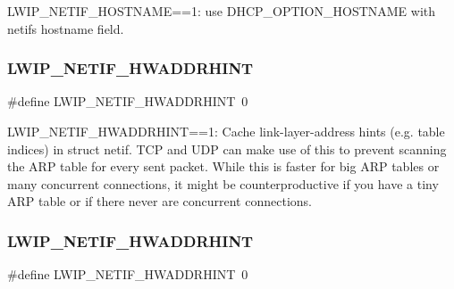 L\+W\+I\+P\+\_\+\+N\+E\+T\+I\+F\+\_\+\+H\+O\+S\+T\+N\+A\+ME==1\+: use D\+H\+C\+P\+\_\+\+O\+P\+T\+I\+O\+N\+\_\+\+H\+O\+S\+T\+N\+A\+ME with netif\textquotesingle{}s hostname field. \mbox{\label{group__lwip__opts__netif_gad1d5e878d94b56ba687cef69be936ad9}} 
\subsubsection{\texorpdfstring{L\+W\+I\+P\+\_\+\+N\+E\+T\+I\+F\+\_\+\+H\+W\+A\+D\+D\+R\+H\+I\+NT}{LWIP\_NETIF\_HWADDRHINT}\hspace{0.1cm}{\footnotesize\ttfamily [1/2]}}
{\footnotesize\ttfamily \#define L\+W\+I\+P\+\_\+\+N\+E\+T\+I\+F\+\_\+\+H\+W\+A\+D\+D\+R\+H\+I\+NT~0}

L\+W\+I\+P\+\_\+\+N\+E\+T\+I\+F\+\_\+\+H\+W\+A\+D\+D\+R\+H\+I\+NT==1\+: Cache link-\/layer-\/address hints (e.\+g. table indices) in struct netif. T\+CP and U\+DP can make use of this to prevent scanning the A\+RP table for every sent packet. While this is faster for big A\+RP tables or many concurrent connections, it might be counterproductive if you have a tiny A\+RP table or if there never are concurrent connections. \mbox{\label{group__lwip__opts__netif_gad1d5e878d94b56ba687cef69be936ad9}} 
\subsubsection{\texorpdfstring{L\+W\+I\+P\+\_\+\+N\+E\+T\+I\+F\+\_\+\+H\+W\+A\+D\+D\+R\+H\+I\+NT}{LWIP\_NETIF\_HWADDRHINT}\hspace{0.1cm}{\footnotesize\ttfamily [2/2]}}
{\footnotesize\ttfamily \#define L\+W\+I\+P\+\_\+\+N\+E\+T\+I\+F\+\_\+\+H\+W\+A\+D\+D\+R\+H\+I\+NT~0}

